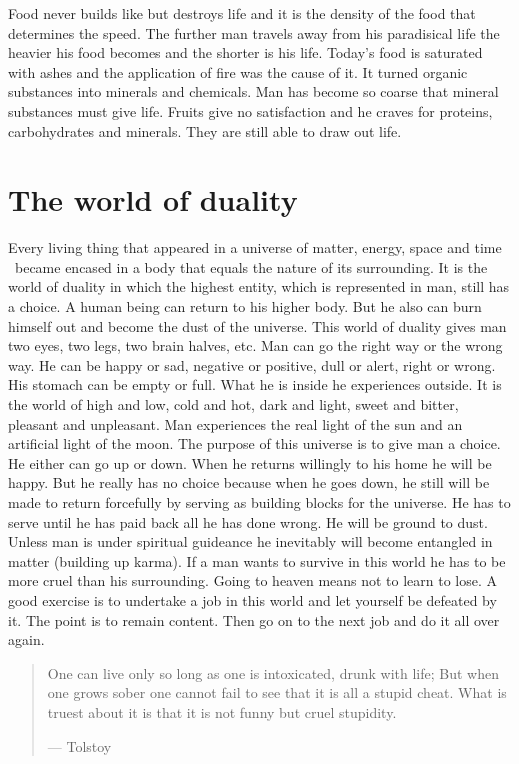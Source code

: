 \documentclass[12pt,letterpaper]{article}
\newcommand{\mest}{matter, energy, space and time }
\begin{document}
Food never builds like but destroys life and it is the density of the
food that determines the speed. The further man travels away from his
paradisical life the heavier his food becomes and the shorter is his
life. Today's food is saturated with ashes and the application of fire
was the cause of it. It turned organic substances into minerals and
chemicals. Man has become so coarse that mineral substances must give
life. Fruits give no satisfaction and he craves for proteins,
carbohydrates and minerals. They are still able to draw out life.


\section{The world of duality}
\label{sec:twod}

Every living thing that appeared in a universe of \mest\  became encased
in a body that equals the nature of its surrounding. It is the world
of duality in which the highest entity, which is represented in man,
still has a choice. A human being can return to his higher body. But
he also can burn himself out and become the dust of the universe. This
world of duality gives man two eyes, two legs, two brain halves,
etc. Man can go the right way or the wrong way. He can be happy or
sad, negative or positive, dull or alert, right or wrong. His stomach
can be empty or full. What he is inside he experiences outside. It is
the world of high and low, cold and hot, dark and light, sweet and
bitter, pleasant and unpleasant. Man experiences the real light of the
sun and an artificial light of the moon. The purpose of this universe
is to give man a choice. He either can go up or down. When he returns
willingly to his home he will be happy. But he really has no choice
because when he goes down, he still will be made to return forcefully
by serving as building blocks for the universe. He has to serve until
he has paid back all he has done wrong. He will be ground to
dust. Unless man is under spiritual guideance he inevitably will
become entangled in matter (building up karma). If a man wants to
survive in this world he has to be more cruel than his
surrounding. Going to heaven means not to learn to lose. A good
exercise is to undertake a job in this world and let yourself be
defeated by it. The point is to remain content. Then go on to the next
job and do it all over again.

\begin{quote} One can live only so long as one is intoxicated, drunk
with life; But when one grows sober one cannot fail to see that it is
all a stupid cheat. What is truest about it is that it is not funny
but cruel stupidity.

--- Tolstoy
\end{quote}
\end{document}
